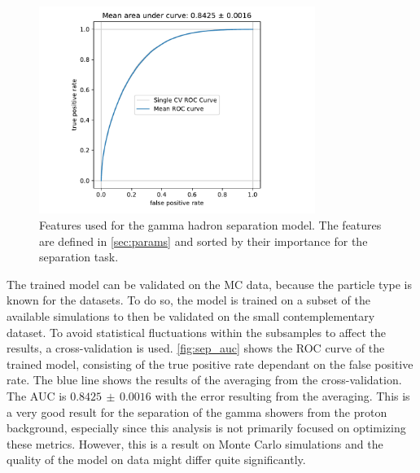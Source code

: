 \begin{figure}
  \centering
  \includegraphics[width=0.8\textwidth, page=4]{Plots/results/DBSCAN/separation_performance.pdf}
  \caption{Features used for the gamma hadron separation model. The features are defined in \autoref{sec:params} and sorted by their importance for the separation task.}
  \label{fig:sep_feat}
\end{figure}
%
The trained model can be validated on the MC data, because the particle type is
known for the datasets. To do so, the model is trained on a subset of the
available simulations to then be validated on the small contemplementary
dataset. To avoid statistical fluctuations within the subsamples to affect the
results, a cross-validation is used. \autoref{fig:sep_auc} shows the ROC curve
of the trained model, consisting of the true positive rate dependant on the
false positive rate. The blue line shows the results of the averaging from the
cross-validation. The AUC is $0.8425\,\pm\,0.0016$ with the error resulting
from the averaging. This is a very good result for the separation of the gamma
showers from the proton background, especially since this analysis is not
primarily focused on optimizing these metrics. However, this is a result on
Monte Carlo simulations and the quality of the model on data might differ quite
significantly.
%
